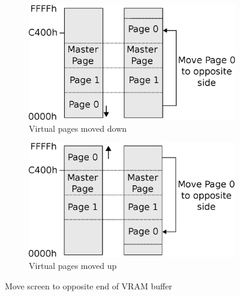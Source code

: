 \documentclass[book.tex]{subfiles}
\begin{document}
\par
\begin{figure}[H]
\centering
\begin{subfigure}{.5\textwidth}
  \centering
  \includegraphics[width=.9\textwidth]{imgs/drawings/Page_down_switch.eps}
  \caption*{Virtual pages moved down}
  \label{fig:page0_down}
\end{subfigure}%
\begin{subfigure}{.5\textwidth}
  \centering
  \includegraphics[width=.9\textwidth]{imgs/drawings/Page_up_switch.eps}
    \caption*{Virtual pages moved up}
  \label{fig:page0_up}
\end{subfigure}
\caption{Move screen to opposite end of VRAM buffer}
\label{fig:page_wrapping}
\end{figure}
\end{document}
